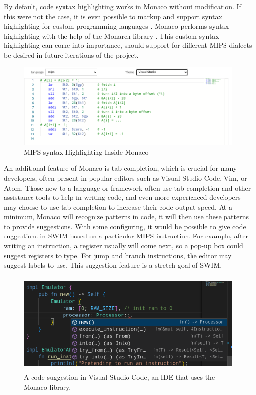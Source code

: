 \documentclass[
    paper=letter,
    parskip=half,
    fontsize=12pt,
    titlepage=firstiscover,
    toc=bibliography,
    numbers=endperiod
]{scrartcl}
\begin{document}
By default, code syntax highlighting works in Monaco without
modification. If this were not the case, it is even possible to markup
and support syntax highlighting for custom programming languages
\cite{monaco-custom-languages}. Monaco performs syntax highlighting with
the help of the Monarch library \cite{monarch}. This custom syntax
highlighting can come into importance, should support for different MIPS
dialects be desired in future iterations of the project.

\begin{figure}[H]
    \includegraphics[width=\textwidth]{monaco-mips-syntax-highlighting}
    \caption{MIPS syntax Highlighting Inside Monaco}
\end{figure}

An additional feature of Monaco is tab completion, which is crucial for
many developers, often present in popular editors such as Visual Studio
Code, Vim, or Atom. Those new to a language or framework often use tab
completion and other assistance tools to help in writing code, and even
more experienced developers may choose to use tab completion to increase
their code output speed. At a minimum, Monaco will recognize patterns in
code, it will then use these patterns to provide suggestions. With some
configuring, it would be possible to give code suggestions in SWIM based
on a particular MIPS instruction. For example, after writing an
instruction, a register usually will come next, so a pop-up box could
suggest registers to type. For jump and branch instructions, the editor
may suggest labels to use. This suggestion feature is a stretch goal of
SWIM.

\begin{figure}[H]
    \includegraphics[height=5cm]{monaco-suggestions}
    \caption{A code suggestion in Visual Studio Code, an IDE that uses the Monaco library.}
\end{figure}
\end{document}
